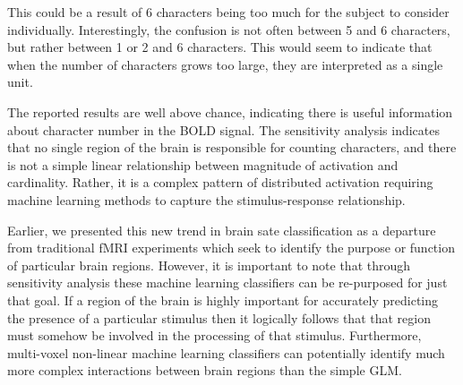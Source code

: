 \documentclass[preprint,5p,authoryear]{elsarticle}
\begin{document}
This could be a result of 6 characters being too much for the subject to consider individually.
Interestingly, the confusion is not often between 5 and 6 characters, but rather between 1 or 2 and 6 characters.
This would seem to indicate that when the number of characters grows too large, they are interpreted as a single unit.

The reported results are well above chance, indicating there is useful information about character number in the BOLD signal.
The sensitivity analysis indicates that no single region of the brain is responsible for counting characters, and there is not a simple linear relationship between magnitude of activation and cardinality.
Rather, it is a complex pattern of distributed activation requiring machine learning methods to capture the stimulus-response relationship.

Earlier, we presented this new trend in brain sate classification as a departure from traditional fMRI experiments which seek to identify the purpose or function of particular brain regions.
However, it is important to note that through sensitivity analysis these machine learning classifiers can be re-purposed for just that goal.
If a region of the brain is highly important for accurately predicting the presence of a particular stimulus then it logically follows that that region must somehow be involved in the processing of that stimulus.
Furthermore, multi-voxel non-linear machine learning classifiers can potentially identify much more complex interactions between brain regions than the simple GLM.


\end{document}
